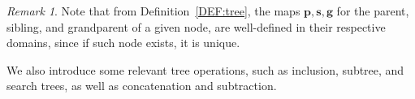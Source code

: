 \documentclass[%
11pt,  reqno]{amsart}
\makeatletter
\newcommand{\5}{\textup{V}}
\newcommand{\noi}{\noindent}
\newtheorem{example}{Example}
\theoremstyle{remark}
\newtheorem{remark}[theorem]{Remark}
\newcommand{\pb}{\mathbf{p}}
\newcommand{\gb}{\mathbf{g}}
\newcommand{\sbf}{\mathbf{s}}
\def\<#1>{\csname MH@symb@#1\endcsname}
\numberwithin{equation}{section}
\numberwithin{theorem}{section}
\newcommand{\andreia}[1]{\marginpar{\color{purple} $\Leftarrow\Leftarrow\Leftarrow$}{\smallskip \noi\color{purple}ANDREIA: #1}\smallskip}
\makeatother
\begin{document}
\begin{remark}\rm 
Note that from Definition~\ref{DEF:tree}, the maps $\pb, \sbf, \gb$ for the parent, sibling, and grandparent of a given node, are well-defined in their respective domains, since if such node exists, it is unique. 

\end{remark}


%



%
%
%








We also introduce some relevant tree operations, such as inclusion, subtree, and search trees, as well as concatenation and subtraction. %
\end{document}
